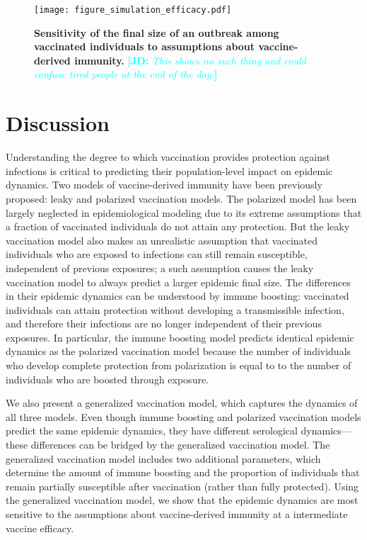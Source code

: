 \documentclass[12pt]{article}
\newcommand{\comment}{\showcomment}
\newcommand{\showcomment}[3]{\textcolor{#1}{\textbf{[#2: }\textsl{#3}\textbf{]}}}
\newcommand{\jd}[1]{\comment{cyan}{JD}{#1}}
\begin{document}
\begin{figure}[!th]
\texttt{[image: figure\_simulation\_efficacy.pdf]}
\caption{
\textbf{Sensitivity of the final size of an outbreak among vaccinated individuals to assumptions about vaccine-derived immunity.}
\jd{This shows no such thing and could confuse tired people at the end of the day.}
\label{fig:efficacy}
}
\end{figure}

\section*{Discussion}

Understanding the degree to which vaccination provides protection against infections is critical to predicting their population-level impact on epidemic dynamics.
Two models of vaccine-derived immunity have been previously proposed: leaky and polarized vaccination models.
The polarized model has been largely neglected in epidemiological modeling due to its extreme assumptions that a fraction of vaccinated individuals do not attain any protection. 
But the leaky vaccination model also makes an unrealistic assumption that vaccinated individuals who are exposed to infections can still remain susceptible, independent of previous exposures; 
a such assumption causes the leaky vaccination model to always predict a larger epidemic final size.
The differences in their epidemic dynamics can be understood by immune boosting: vaccinated individuals can attain protection without developing a transmissible infection, and therefore their infections are no longer independent of their previous exposures.
In particular, the immune boosting model predicts identical epidemic dynamics as the polarized vaccination model because the number of individuals who develop complete protection from polarization is equal to to the number of individuals who are boosted through exposure.

We also present a generalized vaccination model, which captures the dynamics of all three models.
Even though immune boosting and polarized vaccination models predict the same epidemic dynamics, they have different serological dynamics---these differences can be bridged by the generalized vaccination model.
The generalized vaccination model includes two additional parameters, which determine the amount of immune boosting and the proportion of individuals that remain partially susceptible after vaccination (rather than fully protected).
Using the generalized vaccination model, we show that the epidemic dynamics are most sensitive to the assumptions about vaccine-derived immunity at a intermediate vaccine efficacy.
\end{document}
